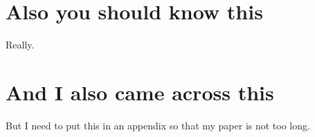 \begin{subappendices}
\renewcommand{\thesection}{\Alph{section}}%

\section{Also you should know this}
Really.
\section{And I also came across this}
But I need to put this in an appendix so that my paper is not too long.
\end{subappendices}